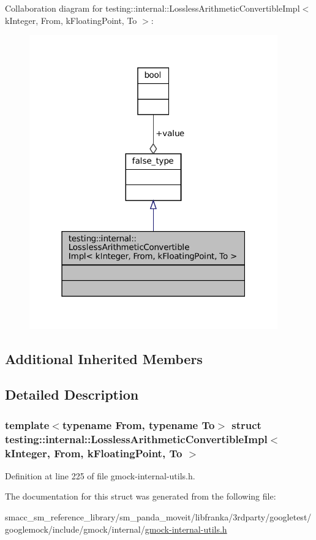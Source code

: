 Collaboration diagram for testing\+:\+:internal\+:\+:Lossless\+Arithmetic\+Convertible\+Impl$<$ k\+Integer, From, k\+Floating\+Point, To $>$\+:
\nopagebreak
\begin{figure}[H]
\begin{center}
\leavevmode
\includegraphics[width=304pt]{structtesting_1_1internal_1_1LosslessArithmeticConvertibleImpl_3_01kInteger_00_01From_00_01kFloab2f8977d4fb612cb1a7b9a19e9be6516}
\end{center}
\end{figure}
\subsection*{Additional Inherited Members}


\subsection{Detailed Description}
\subsubsection*{template$<$typename From, typename To$>$\newline
struct testing\+::internal\+::\+Lossless\+Arithmetic\+Convertible\+Impl$<$ k\+Integer, From, k\+Floating\+Point, To $>$}



Definition at line 225 of file gmock-\/internal-\/utils.\+h.



The documentation for this struct was generated from the following file\+:\begin{DoxyCompactItemize}
\item 
smacc\+\_\+sm\+\_\+reference\+\_\+library/sm\+\_\+panda\+\_\+moveit/libfranka/3rdparty/googletest/googlemock/include/gmock/internal/\hyperlink{gmock-internal-utils_8h}{gmock-\/internal-\/utils.\+h}\end{DoxyCompactItemize}
